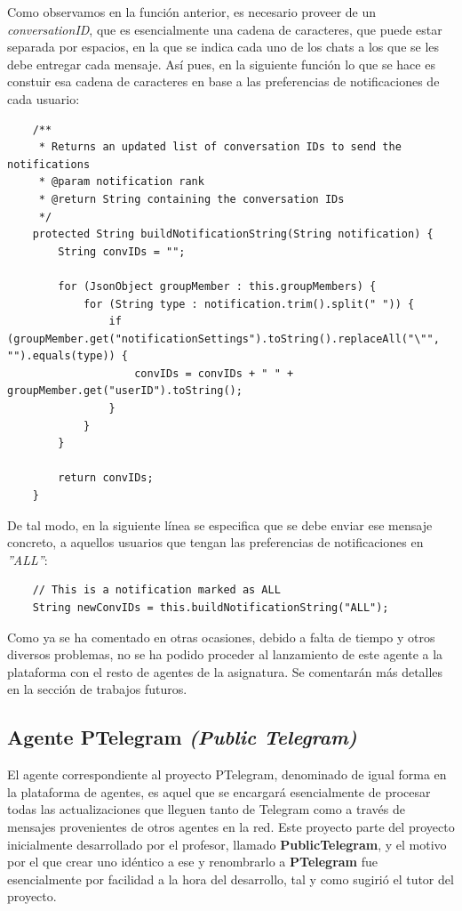 Como observamos en la función anterior, es necesario proveer de un \textit{conversationID}, que es esencialmente una cadena de caracteres, que puede estar separada por espacios, en la que se indica cada uno de los chats a los que se les debe entregar cada mensaje. Así pues, en la siguiente función lo que se hace es constuir esa cadena de caracteres en base a las preferencias de notificaciones de cada usuario:\\

\begin{lstlisting}
    /**
     * Returns an updated list of conversation IDs to send the notifications
     * @param notification rank
     * @return String containing the conversation IDs
     */
    protected String buildNotificationString(String notification) {
        String convIDs = "";
        
        for (JsonObject groupMember : this.groupMembers) {
            for (String type : notification.trim().split(" ")) {
                if (groupMember.get("notificationSettings").toString().replaceAll("\"", "").equals(type)) {
                    convIDs = convIDs + " " + groupMember.get("userID").toString();
                }
            }
        }
        
        return convIDs;
    }
\end{lstlisting}

De tal modo, en la siguiente línea se especifica que se debe enviar ese mensaje concreto, a aquellos usuarios que tengan las preferencias de notificaciones en \textit{''ALL''}:\\

\begin{lstlisting}
    // This is a notification marked as ALL
    String newConvIDs = this.buildNotificationString("ALL");
\end{lstlisting}

Como ya se ha comentado en otras ocasiones, debido a falta de tiempo y otros diversos problemas, no se ha podido proceder al lanzamiento de este agente a la plataforma con el resto de agentes de la asignatura. Se comentarán más detalles en la sección de trabajos futuros.

\subsection{Agente PTelegram \textit{(Public Telegram)}}

El agente correspondiente al proyecto PTelegram, denominado de igual forma en la plataforma de agentes, es aquel que se encargará esencialmente de procesar todas las actualizaciones que lleguen tanto de Telegram como a través de mensajes provenientes de otros agentes en la red. Este proyecto parte del proyecto inicialmente desarrollado por el profesor, llamado \textbf{PublicTelegram}, y el motivo por el que crear uno idéntico a ese y renombrarlo a \textbf{PTelegram} fue esencialmente por facilidad a la hora del desarrollo, tal y como sugirió el tutor del proyecto.\\

